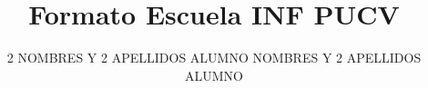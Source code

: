 \documentclass[siglas, glosario, simbolos, tesis]{INFFormat}
\title{Formato Escuela INF PUCV}
\author{
    2 NOMBRES Y 2 APELLIDOS ALUMNO
    \authorspace
    2 NOMBRES Y 2 APELLIDOS ALUMNO
}
\date{\MONTH\ \YEAR}
\begin{document}
    \maketitle

    \makecorpus
    
    
    
    

    
    
    
    
    
    
    
    
\end{document}

